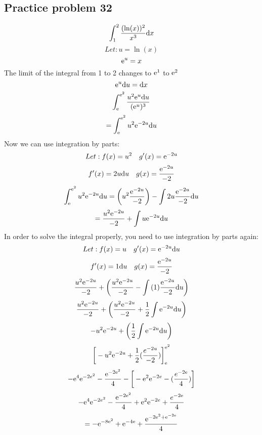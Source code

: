 \documentclass{math}
\begin{document}
\subsection*{Practice problem 32}
\[ \int_{1}^{2}{\frac{(\ln(x))^2}{x^{3}}\mathrm{d}{x}} \]
\[ Let: u = \ln(x) \]
\[ \mathrm{e}^{u} = x \]
The limit of the integral from 1 to 2 changes to \( \mathrm{e}^{1} \) to \( \mathrm{e}^{2} \)
\[ \mathrm{e}^{u}\mathrm{d}{u} = \mathrm{d}{x} \]
\[ \int_{\mathrm{e}}^{\mathrm{e}^{2}}{\frac{u^{2}\mathrm{e}^{u}\mathrm{d}{u}}{(\mathrm{e}^{u})^{3}}} \]
\[ = \int_{\mathrm{e}}^{\mathrm{e}^{2}}{u^{2}\mathrm{e}^{-2u}\mathrm{d}{u}} \]
Now we can use integration by parts:
\[ Let: f(x) = u^{2} \quad g'(x) = \mathrm{e}^{-2u} \]
\[ f'(x) = 2u\mathrm{d}{u} \quad g(x) = \frac{\mathrm{e}^{-2u}}{-2} \]
\[ \int_{\mathrm{e}}^{\mathrm{e}^{2}}{u^{2}\mathrm{e}^{-2u}\mathrm{d}{u}} =
   \bigg(u^{2}\frac{\mathrm{e}^{-2u}}{-2}\bigg)-\int{2u\frac{\mathrm{e}^{-2u}}{-2}\mathrm{d}{u}} \]
\[ = \frac{u^{2}\mathrm{e}^{-2u}}{-2}+\int{u\mathrm{e}^{-2u}\mathrm{d}{u}} \]
In order to solve the integral properly, you need to use integration by parts
again:
\[ Let: f(x) = u \quad g'(x) = \mathrm{e}^{-2u}\mathrm{d}{u} \]
\[ f'(x) = 1\mathrm{d}{u} \quad g(x) = \frac{\mathrm{e}^{-2u}}{-2} \]
\[ \frac{u^{2}\mathrm{e}^{-2u}}{-2}+
   \bigg(\frac{u^{2}\mathrm{e}^{-2u}}{-2}-\int{(1)\frac{\mathrm{e}^{-2u}}{-2}\mathrm{d}{u}}\bigg) \]
\[ \frac{u^{2}\mathrm{e}^{-2u}}{-2}+
   \bigg(\frac{u^{2}\mathrm{e}^{-2u}}{-2}+\frac{1}{2}\int{\mathrm{e}^{-2u}\mathrm{d}{u}}\bigg) \]
\[ -u^{2}\mathrm{e}^{-2u}+\bigg(\frac{1}{2}\int{\mathrm{e}^{-2u}\mathrm{d}{u}}\bigg) \]
\[ \bigg[-u^{2}\mathrm{e}^{-2u}+\frac{1}{2}(\frac{e^{-2u}}{-2})\bigg]_{\mathrm{e}}^{\mathrm{e}^{2}} \]
\[ -\mathrm{e}^{4}\mathrm{e}^{-2e^{2}}-\frac{\mathrm{e}^{-2\mathrm{e}^{2}}}{4}-
   \bigg[-\mathrm{e}^{2}\mathrm{e}^{-2e}-(\frac{e^{-2\mathrm{e}}}{4})\bigg] \]
\[ -\mathrm{e}^{4}\mathrm{e}^{-2e^{2}}-\frac{\mathrm{e}^{-2\mathrm{e}^{2}}}{4}+
   \mathrm{e}^{2}\mathrm{e}^{-2e}+\frac{e^{-2\mathrm{e}}}{4} \]
\[ = -\mathrm{e}^{-8\mathrm{e}^{2}}+\mathrm{e}^{-4\mathrm{e}}+\frac{\mathrm{e}^{-2\mathrm{e}^{2}+\mathrm{e}^{-2\mathrm{e}}}}{4} \]
\end{document}
